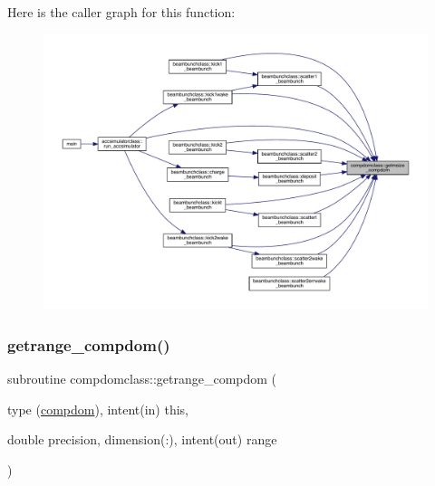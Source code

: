 Here is the caller graph for this function\+:\nopagebreak
\begin{figure}[H]
\begin{center}
\leavevmode
\includegraphics[width=350pt]{namespacecompdomclass_a460a22916802ee9041aa66d1922cb812_icgraph}
\end{center}
\end{figure}
\mbox{\label{namespacecompdomclass_acba710aa1017492e05a537273742cc16}} 
\subsubsection{\texorpdfstring{getrange\_compdom()}{getrange\_compdom()}}
{\footnotesize\ttfamily subroutine compdomclass\+::getrange\+\_\+compdom (\begin{DoxyParamCaption}\item[{type (\mbox{\hyperlink{namespacecompdomclass_structcompdomclass_1_1compdom}{compdom}}), intent(in)}]{this,  }\item[{double precision, dimension(\+:), intent(out)}]{range }\end{DoxyParamCaption})}

